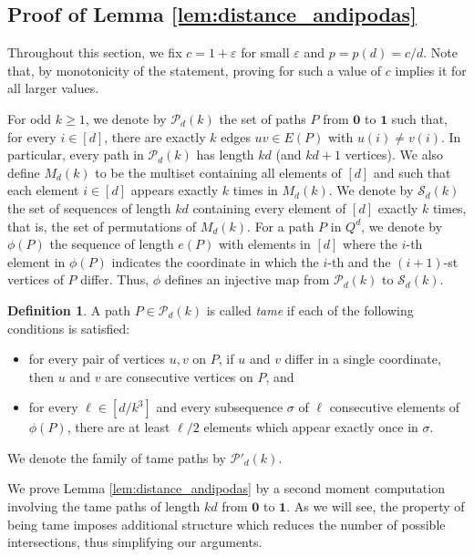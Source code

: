 \documentclass[reqno,final,a4paper]{amsart}
\theoremstyle{definition}
\newtheorem{definition}[thm]{Definition}
\newcommand{\cP}{\mathcal{P}}
\def\eps{\varepsilon}
\newcommand{\1}{\mathbbm{1}}
\begin{document}
\subsection{Proof of Lemma \ref{lem:distance_andipodas} }\label{sec:proofs_aux_lemmas}
Throughout this section, we fix $c=1+\eps$ for small $\eps$ and $p=p(d)=c/d$. 
Note that, by monotonicity of the statement, proving  for such a value of $c$ implies it for all larger values. 

For odd $k\geq 1$, we denote by $\mathcal{P}_d(k)$ the set of paths $P$ from $\textbf{0}$ to $\textbf{1}$ such that, for every $i\in [d]$, there are exactly $k$ edges $uv\in E(P)$ with $u(i)\neq v(i)$. In particular, every path in $\cP_d(k)$ has length $kd$ (and $kd+1$ vertices). 
We also define $M_d(k)$ to be the multiset containing all elements of $[d]$ and such that each element $i\in [d]$ appears exactly $k$ times in $M_d(k)$. 
We denote by $\mathcal{S}_d(k)$ the set of sequences of length $kd$ containing every element of $[d]$ exactly $k$ times, that is, the set of permutations of $M_d(k)$.
For a path $P$ in $Q^d$, we denote by $\phi(P)$ the sequence of length $e(P)$ with elements in $[d]$ where the $i$-th element in $\phi(P)$ indicates the coordinate in which the $i$-th and the $(i+1)$-st vertices of $P$ differ. 
Thus, $\phi$ defines an injective map from  $\mathcal{P}_d(k)$ to $\mathcal{S}_d(k)$.

\begin{definition}\label{def:tame}
    A path $P\in \mathcal{P}_d(k)$ is called \emph{tame} if each of the following conditions is satisfied:
    \begin{itemize}
        \item[\textbf{P1}] for every pair of vertices $u,v$ on $P$, if $u$ and $v$ differ in a single coordinate, then $u$ and $v$ are consecutive vertices on $P$, and
        \item[\textbf{P2}] for every $\ell\in [d/k^3]$ and every subsequence $\sigma$ of $\ell$ consecutive elements of $\phi(P)$, there are at least $\ell/2$ elements which appear exactly once in $\sigma$.
    \end{itemize}  
    We denote the family of tame paths by $\cP'_d(k)$.
\end{definition}
   
We prove Lemma \ref{lem:distance_andipodas} by a second moment computation involving the tame paths of length $kd$ from $\textbf{0}$ to $\textbf{1}$. 
As we will see, the property of being tame imposes additional structure which reduces the number of possible intersections, thus simplifying our arguments.
\end{document}
